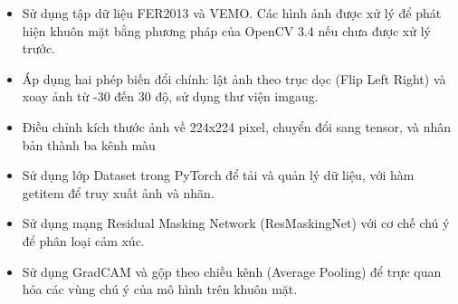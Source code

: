 \begin{itemize}
    \item Sử dụng tập dữ liệu FER2013 và VEMO. Các hình ảnh được xử lý để phát hiện khuôn mặt bằng phương pháp của OpenCV 3.4 nếu chưa được xử lý trước.
    \item Áp dụng hai phép biến đổi chính: lật ảnh theo trục dọc (Flip Left Right) và xoay ảnh từ -30 đến 30 độ, sử dụng thư viện imgaug.
    \item Điều chỉnh kích thước ảnh về 224x224 pixel, chuyển đổi sang tensor, và nhân bản thành ba kênh màu
    \item Sử dụng lớp Dataset trong PyTorch để tải và quản lý dữ liệu, với hàm getitem để truy xuất ảnh và nhãn.
    \item Sử dụng mạng Residual Masking Network (ResMaskingNet) với cơ chế chú ý để phân loại cảm xúc.
    \item Sử dụng GradCAM và gộp theo chiều kênh (Average Pooling) để trực quan hóa các vùng chú ý của mô hình trên khuôn mặt.
\end{itemize}